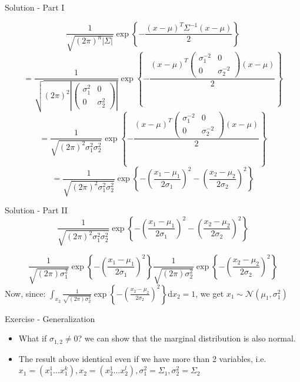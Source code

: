 \documentclass[11pt, usenames, dvipsnames]{beamer}
\begin{document}
\begin{frame}{Solution - Part I}

$$\frac{1}{\sqrt{\left(2\pi\right)^{n}\left|\Sigma\right|}}\exp\left\{ -\frac{\left(x-\mu\right)^{T}\Sigma^{-1}\left(x-\mu\right)}{2}\right\}$$
\pause
$$ = \frac{1}{\sqrt{\left(2\pi\right)^{2}\left|\left(\begin{array}{cc}
\sigma_{1}^{2} & 0\\
0 & \sigma_{2}^{2}
\end{array}\right)\right|}}\exp\left\{ -\frac{\left(x-\mu\right)^{T}\left(\begin{array}{cc}
\sigma_{1}^{-2} & 0\\
0 & \sigma_{2}^{-2}
\end{array}\right)\left(x-\mu\right)}{2}\right\} $$
\pause
$$ = \frac{1}{\sqrt{\left(2\pi\right)^{2}\sigma_{1}^{2}\sigma_{2}^{2}}}\exp\left\{ -\frac{\left(x-\mu\right)^{T}\left(\begin{array}{cc}
\sigma_{1}^{-2} & 0\\
0 & \sigma_{2}^{-2}
\end{array}\right)\left(x-\mu\right)}{2}\right\} $$
\pause
$$= \frac{1}{\sqrt{\left(2\pi\right)^{2}\sigma_{1}^{2}\sigma_{2}^{2}}}\exp\left\{ -\left(\frac{x_{1}-\mu_{1}}{2\sigma_{1}}\right)^{2}-\left(\frac{x_{2}-\mu_{2}}{2\sigma_{2}}\right)^{2}\right\} $$

\end{frame}

\begin{frame}{Solution - Part II}
$$\frac{1}{\sqrt{\left(2\pi\right)^{2}\sigma_{1}^{2}\sigma_{2}^{2}}}\exp\left\{ -\left(\frac{x_{1}-\mu_{1}}{2\sigma_{1}}\right)^{2}-\left(\frac{x_{2}-\mu_{2}}{2\sigma_{2}}\right)^{2}\right\} $$
\pause

$$\frac{1}{\sqrt{\left(2\pi\right)\sigma_{1}^{2}}}\exp\left\{ -\left(\frac{x_{1}-\mu_{1}}{2\sigma_{1}}\right)^{2}\right\} \frac{1}{\sqrt{\left(2\pi\right)\sigma_{2}^{2}}}\exp\left\{ -\left(\frac{x_{2}-\mu_{2}}{2\sigma_{2}}\right)^{2}\right\}$$
\pause
Now, since: $\int_{x_2}\frac{1}{\sqrt{\left(2\pi\right)\sigma_{2}^{2}}}\exp\left\{ -\left(\frac{x_{2}-\mu_{2}}{2\sigma_{2}}\right)^{2}\right\} 
\mathrm{d}x_2=1$, we get $x_1\sim\mathcal{N}({\mu_1},{\sigma_1^2})$
\end{frame}
\endgroup
\begin{frame}{Exercise - Generalization}
    \begin{itemize}
        \item What if $\sigma_{1,2}\neq 0$? we can show that the marginal distribution is also normal.
        \pause
        \item The result above identical even if we have more than 2 variables, i.e. $x_1=(x_1^1...x_1^k), x_2=(x_2^1...x_2^l), \sigma_1^2=\Sigma_1, \sigma_2^2=\Sigma_2$
    \end{itemize}
\end{frame}
\end{document}
